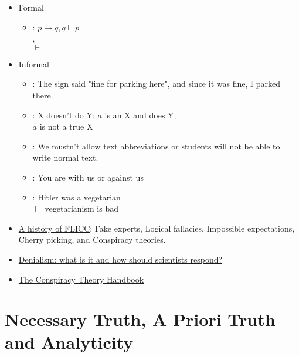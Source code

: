 \documentclass[headrule,footrule]{foils}
\begin{document}
\begin{itemize}
\item Formal
  \begin{itemize}
  \item {}: $p \rightarrow q, q \vdash p$
    \\ , 
    \\ $\vdash$ 
  \end{itemize}
\item Informal
  \begin{itemize}
  \item {}:  The sign said "fine for parking here", and since it was fine, I parked there. 
  \item {}: X doesn't do Y; $a$ is an X and does Y;
    \\ $a$ is not a true X
  \item {}: We mustn't allow text abbreviations or students will not be able to write normal text.
  \item {}: You are with us or against us
  \item {}: Hitler was a vegetarian \\
    $\vdash$ vegetarianism is bad
  \end{itemize}
\end{itemize}


\begin{itemize}
\item
  \href{https://crankyuncle.com/a-history-of-flicc-the-5-techniques-of-science-denial/}{A
    history of FLICC}: Fake experts, Logical fallacies, Impossible expectations, Cherry picking, and Conspiracy theories.
  
\item \href{https://academic.oup.com/eurpub/article/19/1/2/463780}{Denialism: what is it and how should scientists respond?}
\item \href{https://www.climatechangecommunication.org/conspiracy-theory-handbook/}{The Conspiracy Theory Handbook}
\end{itemize}


\section{Necessary Truth, A Priori Truth and Analyticity}
\end{document}
